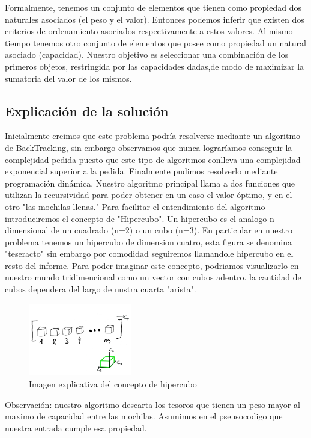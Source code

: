 \documentclass[spanish,12pt]{article}
\begin{document}
Formalmente, tenemos un conjunto de elementos que tienen como propiedad dos naturales asociados (el peso y el valor). Entonces podemos inferir que existen dos criterios de ordenamiento asociados respectivamente a estos valores.
Al mismo tiempo tenemos otro conjunto de elementos que posee como propiedad un natural asociado (capacidad).
Nuestro objetivo es seleccionar una combinación de los primeros objetos, restringida por las capacidades dadas,de modo de maximizar la sumatoria del valor de los mismos.


\subsection{Explicación de la solución}

   Inicialmente creimos que este problema podría resolverse mediante un algoritmo de BackTracking, sin embargo observamos que nunca lograríamos conseguir la complejidad pedida puesto que este tipo de algoritmos conlleva una complejidad exponencial superior a la pedida.
   Finalmente pudimos resolverlo mediante programación dinámica. Nuestro algoritmo principal llama a dos funciones que utilizan la recursividad para poder obtener en un caso el valor óptimo, y en el otro "las mochilas llenas."
   Para facilitar el entendimiento del algoritmo introduciremos el concepto de "Hipercubo". Un hipercubo es el analogo n-dimensional de un cuadrado (n=2) o un cubo (n=3). En particular en nuestro problema tenemos un hipercubo de dimension cuatro, esta figura se denomina "teseracto" sin embargo por comodidad seguiremos llamandole hipercubo en el resto del informe.
Para poder imaginar este concepto, podriamos visualizarlo en nuestro mundo tridimencional como un vector con cubos adentro. la cantidad de cubos dependera del largo de nustra cuarta "arista".

\begin{figure}[H]
\centering
\includegraphics[width=0.4\textwidth]{hipercubo}
\caption{Imagen explicativa del concepto de hipercubo}
\end{figure}


Observación: nuestro algoritmo descarta los tesoros que tienen un peso mayor al maximo de capacidad entre las mochilas. Asumimos en el pseusocodigo que nuestra entrada cumple esa propiedad.
\end{document}
